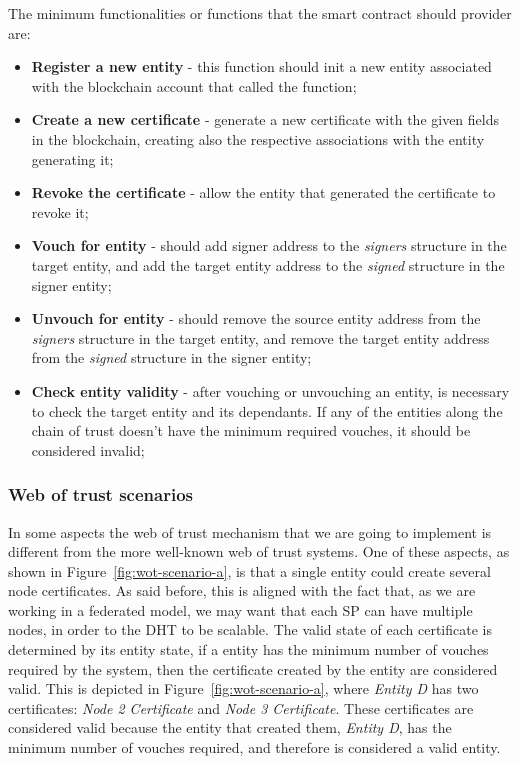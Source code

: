The minimum functionalities or functions that the smart contract should provider are:

\begin{itemize}
  \item \textbf{Register a new entity} - this function should init a new entity associated with the blockchain account that called the function;
  \item \textbf{Create a new certificate} - generate a new certificate with the given fields in the blockchain, creating also the respective associations with the entity generating it;
  \item \textbf{Revoke the certificate} - allow the entity that generated the certificate to revoke it;
  \item \textbf{Vouch for entity} - should add signer address to the \textit{signers} structure in the target entity, and add the target entity address to the \textit{signed} structure in the signer entity;
  \item \textbf{Unvouch for entity} - should remove the source entity address from the \textit{signers} structure in the target entity, and remove the target entity address from the \textit{signed} structure in the signer entity;
  \item \textbf{Check entity validity} - after vouching or unvouching an entity, is necessary to check the target entity and its dependants. If any of the entities along the chain of trust doesn't have the minimum required vouches, it should be considered invalid;
\end{itemize}


\subsubsection{Web of trust scenarios}

In some aspects the web of trust mechanism that we are going to implement is different from the more well-known web of trust systems.
One of these aspects, as shown in Figure~\ref{fig:wot-scenario-a}, is that a single entity could create several node certificates.
As said before, this is aligned with the fact that, as we are working in a federated model, we may want that each \ac{SP} can have multiple nodes, in order to the \ac{DHT} to be scalable.
The valid state of each certificate is determined by its entity state, if a entity has the minimum number of vouches required by the system, then the certificate created by the entity are considered valid.
This is depicted in Figure~\ref{fig:wot-scenario-a}, where \textit{Entity D} has two certificates: \textit{Node 2 Certificate} and \textit{Node 3 Certificate}.
These certificates are considered valid because the entity that created them, \textit{Entity D}, has the minimum number of vouches required, and therefore is considered a valid entity.

